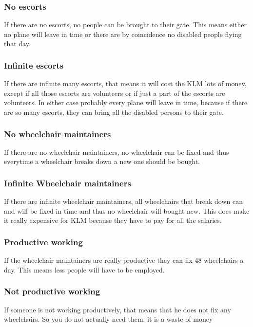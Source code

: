 \documentclass[a4paper, 11pt, notitlepage]{report}
\begin{document}
\subsubsection{No escorts}
If there are no escorts, no people can be brought to their gate. This means either no plane will leave in time or there are by coincidence no disabled people flying that day.
\subsubsection{Infinite escorts}
If there are infinite many escorts, that means it will cost the KLM lots of money, except if all those escorts are volunteers or if just a part of the escorts are volunteers. In either case probably every plane will leave in time, because if there are so many escorts, they can bring all the disabled persons to their gate.
\subsubsection{No wheelchair maintainers}
If there are no wheelchair maintainers, no wheelchair can be fixed and thus everytime a wheelchair breaks down a new one should be bought.
\subsubsection{Infinite Wheelchair maintainers}
If there are infinite wheelchair maintainers, all wheelchairs that break down can and will be fixed in time and thus no wheelchair will bought new. This does make it really expensive for KLM because they have to pay for all the salaries.
\subsubsection{Productive working}
If the wheelchair maintainers are really productive they can fix 48 wheelchairs a day. This means less people will have to be employed.
\subsubsection{Not productive working}
If someone is not working productively, that means that he does not fix any wheelchairs. So you do not actually need them. it is a waste of money
\end{document}
